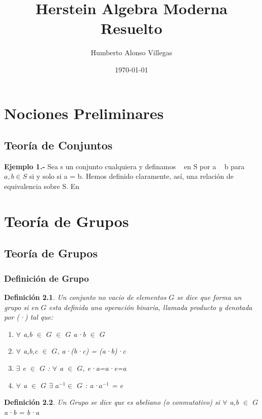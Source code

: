 \documentclass[10pt,a4paper,oneside]{article}
\title{Herstein Algebra Moderna\\Resuelto} %
\author{Humberto Alonso Villegas} %
\date{\today} %
\newtheorem{defi}{Definición}[section]
\begin{document}
	\maketitle %
	\newpage
	
	\chapter{Nociones Preliminares}
		\section[''Teoría de Conjuntos'']{Teoría de Conjuntos}
			\textbf{Ejemplo 1.-} Sea s un conjunto cualquiera y definamos ~ en S por a ~ b para $a, b \in S $ si y solo si a = b. Hemos definido claramente, así, una relación de equivalencia sobre S. En 
	\newpage

	\chapter{Teoría de Grupos}
		\section["Teoría de"]{Teoría de Grupos}
			\subsection{Definición de Grupo}
				\begin{defi}
					Un conjunto no vacio de elementos $G$ se dice que forma un grupo si en $G$ esta definida una operación binaria, llamada producto y denotada por (·) tal que:
					\begin{enumerate}
						\item $\forall$ a,b $\in$ $G$ $\in$ $G$ a·b $\in$ $G$
						\item $\forall$ a,b,c $\in$ $G$, a·(b·c) = (a·b)·c
						\item $\exists$ e $\in$ $G$ : $\forall$ a $\in$ $G$, e·a=a·e=a
						\item $\forall$ a $\in$ $G$ $\exists$ $a^{-1} \in$ $G$ : a·$a^{-1}$ = e
					\end{enumerate}
				\end{defi}
				\begin{defi}
					Un Grupo se dice que es abeliano (o conmutativo) si $\forall$ a,b $\in$ $G$ a·b = b·a
				\end{defi}
\end{document}
